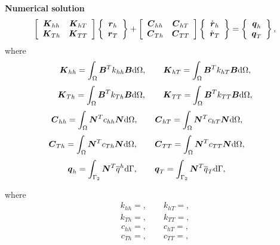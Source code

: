 

{\bf Numerical solution}\\

\begin{eqnarray}\label{final_eq}
\left[ \begin{array}{cc}
\mbox{\boldmath$K$}_{hh} & \mbox{\boldmath$K$}_{hT} \\
\mbox{\boldmath$K$}_{Th} & \mbox{\boldmath$K$}_{TT}
\end{array} \right]
\left\{ \begin{array}{c}
\mbox{\boldmath$r$}_h \\
\mbox{\boldmath$r$}_{T}
\end{array} \right\} + 
\left[ \begin{array}{cc}
\mbox{\boldmath$C$}_{hh} & \mbox{\boldmath$C$}_{hT} \\
\mbox{\boldmath$C$}_{Th} & \mbox{\boldmath$C$}_{TT}
\end{array} \right]
\left\{ \begin{array}{c}
\dot{\mbox{\boldmath$r$}}_h \\
\dot{\mbox{\boldmath$r$}}_{T}
\end{array} \right\} = 
\left\{ \begin{array}{c}
\mbox{\boldmath$q$}_{h} \\
\mbox{\boldmath$q$}_{T}
\end{array} \right\},
\end{eqnarray}
where
\begin{eqnarray}
\mbox{\boldmath$K$}_{hh} = \int_{\Omega} \mbox{\boldmath$B$}^T k_{hh} \mbox{\boldmath$B$}{\rm d}\Omega,
\qquad \mbox{\boldmath$K$}_{hT} = \int_{\Omega} \mbox{\boldmath$B$}^T k_{hT} \mbox{\boldmath$B$}{\rm d}\Omega,
\end{eqnarray}
\begin{eqnarray}
\mbox{\boldmath$K$}_{Th} = \int_{\Omega} \mbox{\boldmath$B$}^T k_{Th} \mbox{\boldmath$B$}{\rm d}\Omega,
\qquad \mbox{\boldmath$K$}_{TT} = \int_{\Omega} \mbox{\boldmath$B$}^T k_{TT} \mbox{\boldmath$B$}{\rm d}\Omega,
\end{eqnarray}
\begin{eqnarray}
\mbox{\boldmath$C$}_{hh} = \int_{\Omega} \mbox{\boldmath$N$}^T c_{hh}  \mbox{\boldmath$N$} {\rm d}\Omega,\qquad
\mbox{\boldmath$C$}_{hT} = \int_{\Omega} \mbox{\boldmath$N$}^T c_{hT}  \mbox{\boldmath$N$} {\rm d}\Omega,\qquad
\end{eqnarray}
\begin{eqnarray}
\mbox{\boldmath$C$}_{Th} = \int_{\Omega} \mbox{\boldmath$N$}^T c_{Th}  \mbox{\boldmath$N$} {\rm d}\Omega,\qquad
\mbox{\boldmath$C$}_{TT} = \int_{\Omega} \mbox{\boldmath$N$}^T c_{TT}  \mbox{\boldmath$N$} {\rm d}\Omega,\qquad
\end{eqnarray}
\begin{eqnarray}
\mbox{\boldmath$q$}_h = \int_{\Gamma_2} \mbox{\boldmath$N$}^T  \overline{q}^{h}{\rm d}\Gamma,\qquad
\mbox{\boldmath$q$}_T = \int_{\Gamma_2} \mbox{\boldmath$N$}^T  \overline{q}_{T}{\rm d}\Gamma,\qquad
\end{eqnarray}

where
\begin{eqnarray}
 k_{hh} = ,
\qquad k_{hT} = ,
\end{eqnarray}
\begin{eqnarray}
 k_{Th} = ,
\qquad k_{TT} = ,
\end{eqnarray}
\begin{eqnarray}
 c_{hh} = ,
\qquad c_{hT} = ,
\end{eqnarray}
\begin{eqnarray}
 c_{Th} = ,
\qquad c_{TT} = ,
\end{eqnarray}
